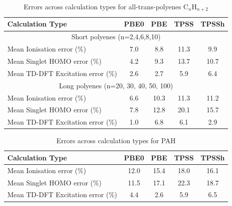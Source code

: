 \documentclass[12pt]{article}
\begin{document}
\newpage

\begin{table}[h]
\caption{Errors across calculation types for all-trans-polyenes C$_n$H$_{n+2}$}
\begin{tabular}{|l| c| c| c| c |}
\hline
\textbf{Calculation Type} & \textbf{PBE0} & \textbf{PBE} & \textbf{TPSS} & \textbf{TPSSh} \\
\hline
\multicolumn{5}{|c|}{Short polyenes (n=2,4,6,8,10)}\\
\hline
Mean Ionisation  error (\%) & 7.0 & 8.8 & 11.3 & 9.9 \\\hline
Mean Singlet HOMO  error (\%) & 4.2 & 9.3 & 13.7 & 10.7 \\\hline
Mean TD-DFT Excitation error (\%) & 2.6 & 2.7 & 5.9 & 6.4 \\ 
\hline
\multicolumn{5}{|c|}{Long polyenes (n=20, 30, 40, 50, 100)}\\
\hline
Mean Ionisation  error (\%) & 6.6 & 10.3 & 11.3 & 11.2 \\\hline
Mean Singlet HOMO  error (\%) & 7.8 & 12.8 & 20.1 & 15.7 \\\hline
Mean TD-DFT Excitation error (\%) & 1.0 & 6.8 & 6.1 & 2.9 \\
\hline
\end{tabular}
\label{table:alkene_errors}
\end{table}

\newpage

\begin{table}[h]
\caption{Errors across calculation types for PAH}
\begin{tabular}{|l |c |c |c |c |}
\hline
\textbf{Calculation Type} & \textbf{PBE0} & \textbf{PBE} & \textbf{TPSS} & \textbf{TPSSh} \\
\hline
Mean Ionisation  error (\%) & 12.0 & 15.4 & 18.0 & 16.1 \\\hline
Mean Singlet HOMO  error (\%) & 11.5 & 17.1 & 22.3 & 18.7 \\\hline
Mean TD-DFT Excitation error (\%) & 4.4 & 2.6 & 5.9 & 6.5 \\
\hline
\end{tabular}
\label{table:ring_system_errors}
\end{table}
\end{document}
